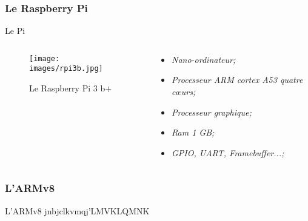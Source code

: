 \documentclass[french]{beamer}
\begin{document}
\subsubsection{Le Raspberry Pi}
\begin{frame}
	\transsplitverticalout
\end{frame}

\begin{frame}{Le Pi}
	\transsplitverticalout
	 \begin{columns}
		
		\begin{column}{0.5\textwidth}
			\begin{figure}
				\texttt{[image: images/rpi3b.jpg]}
				\caption{Le Raspberry Pi 3 b+}
			\end{figure}  
		\end{column}
		
		\begin{column}{0.6\textwidth}
			\begin{beamerboxesrounded}[scheme=blocgrisclair]{}
				\begin{center}
					\begin{itemize}
						\color{nb}
						\large 
						\item<1-> \textit{Nano-ordinateur;}
						\item<2-> \textit{Processeur ARM cortex A53 quatre cœurs;}
						\item<3-> \textit{Processeur graphique;}
						\item<4-> \textit{Ram 1 GB;}
						\item<5-> \textit{GPIO, UART, Framebuffer...;}
					\end{itemize}
				\end{center}
			\end{beamerboxesrounded}
		\end{column}
		
	\end{columns}
\end{frame}

\subsubsection{L'ARMv8}
\begin{frame}
	\transsplitverticalout
\end{frame}

\begin{frame}{L'ARMv8}
	\transsplitverticalout
	jnbjclkvmqj'LMVKLQMNK
\end{frame}
\end{document}
